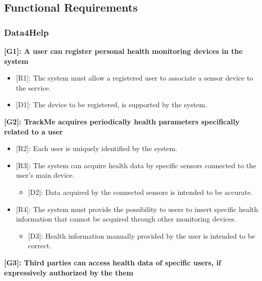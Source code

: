 \paragraph{}


{\color{Blue}\subsection{Functional Requirements}}

{\color{Blue}\subsubsection{Data4Help}}

\textbf{[G1]: A user can register personal health monitoring devices in the system}
\begin{itemize}
	\item {[R1]: The system must allow a registered user to associate a sensor device to the service.}
	\item{[D1]: The device to be registered, is supported by the system.}
\end{itemize}

\textbf{[G2]: TrackMe acquires periodically health parameters specifically related to a user}
\begin{itemize}
	\item {[R2]: Each user is uniquely identified by the system.}
	\item {[R3]: The system can acquire health data by specific sensors connected to the user's main device.}
	\begin{itemize}
		\item {[D2]: Data acquired by the connected sensors is intended to be accurate.}
	\end{itemize}
	\item {[R4]: The system must provide the possibility to users to insert specific health information that cannot be acquired through other monitoring devices.}
	\begin{itemize}
		\item {[D3]: Health information manually provided by the user is intended to be correct.}
	\end{itemize}   
	
\end{itemize}
\textbf{[G3]: Third parties can access health data of specific users, if expressively authorized by the them}

